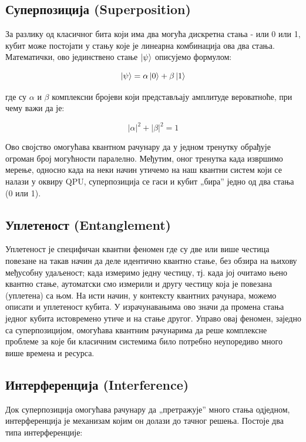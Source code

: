 \documentclass[12pt]{article}
\theoremstyle{plain}
\theoremstyle{definition}
\begin{document}
	\subsection{Суперпозиција (Superposition)}
	За разлику од класичног бита који има два могућа дискретна стања - или 0 или 1, кубит може постојати у стању које је линеарна комбинација ова два стања. Математички, ово јединствено стање $\ket{\psi}$ описујемо формулом:
	
	\begin{equation}
		\ket{\psi}=\alpha\ket{0}+\beta\ket{1}
	\end{equation}
	
	\noindent где су $\alpha$ и $\beta$ комплексни бројеви који представљају амплитуде вероватноће, при чему важи да је:
	
	\begin{equation}
		|\alpha|^2 + |\beta|^2 = 1
	\end{equation}
	
	\noindent Ово својство омогућава квантном рачунару да у једном тренутку обрађује огроман број могућности паралелно. Међутим, оног тренутка када извршимо мерење, односно када на неки начин утичемо на наш квантни систем који се налази у оквиру QPU, суперпозиција се гаси и кубит „бира” једно од два стања (0 или 1).
	
	\subsection{Уплетеност (Entanglement)}
	Уплетеност је специфичан квантни феномен где су две или више честица повезане на такав начин да деле идентично квантно стање, без обзира на њихову међусобну удаљеност; када измеримо једну честицу, тј. када јој очитамо њено квантно стање, аутоматски смо измерили и другу честицу која је повезана (уплетена) са њом. На исти начин, у контексту квантних рачунара, можемо описати и уплетеност кубита. У израчунавањима ово значи да промена стања једног кубита истовремено утиче и на стање другог. Управо овај феномен, заједно са суперпозицијом, омогућава квантним рачунарима да реше комплексне проблеме за које би класичним системима било потребно неупоредиво много више времена и ресурса.
	
	\subsection{Интерференција (Interference)}
	Док суперпозиција омогућава рачунару да „претражује” много стања одједном, интерференција је механизам којим он долази до тачног решења. Постоје два типа интерференције:
	
\end{document}

